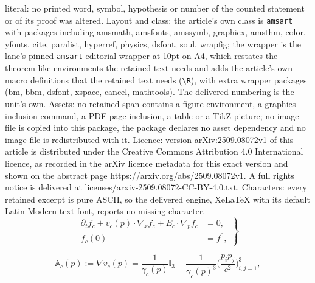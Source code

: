 \documentclass[10pt,a4paper]{amsart}
\begin{document}
literal: no printed word, symbol, hypothesis or number of the counted statement or of its proof was altered. Layout and class: the article's own class is \texttt{amsart} with packages including amsmath, amsfonts, amssymb, graphicx, amsthm, color, yfonts, cite, paralist, hyperref, physics, dsfont, soul, wrapfig; the wrapper is the lane's pinned \texttt{amsart} editorial wrapper at 10pt on A4, which restates the theorem-like environments the retained text needs and adds the article's own macro definitions that the retained text needs (\texttt{\textbackslash R}), with extra wrapper packages (bm, bbm, dsfont, xspace, cancel, mathtools). The delivered numbering is the unit's own. Assets: no retained span contains a figure environment, a graphics-inclusion command, a PDF-page inclusion, a table or a TikZ picture; no image file is copied into this package, the package declares no asset dependency and no image file is redistributed with it. Licence: version arXiv:2509.08072v1 of this article is distributed under the Creative Commons Attribution 4.0 International licence, as recorded in the arXiv licence metadata for this exact version and shown on the abstract page https://arxiv.org/abs/2509.08072v1. A full rights notice is delivered at licenses/arxiv-2509.08072-CC-BY-4.0.txt. Characters: every retained excerpt is pure ASCII, so the delivered engine, XeLaTeX with its default Latin Modern text font, reports no missing character.
\begin{equation}\label{eq: rVP}
\left.
\begin{aligned}
\partial_t f_c+v_c(p)\cdot\nabla_x f_c+E_c\cdot\nabla_p f_c&=0,\\
f_c(0)&=f^0,
\end{aligned}
\right\}
\end{equation}

\begin{equation}
\label{Adef}
    \mathbb{A}_c(p):=\nabla v_c(p)=\frac{1}{\gamma_c(p)}\mathbb{I}_3-\frac{1}{\gamma_c(p)^3}\bigg(\frac{p_i p_j}{c^2}\bigg)_{i,j=1}^3,
\end{equation}
\end{document}
